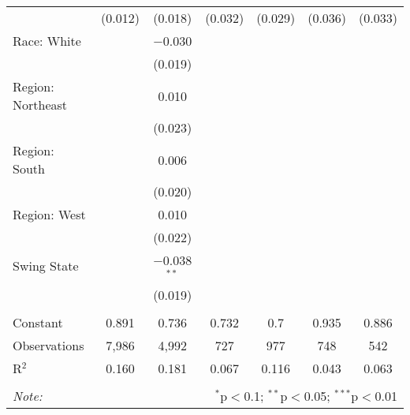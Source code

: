 \begin{tabular}{@{\extracolsep{5pt}}lcccccc}
  & (0.012) & (0.018) & (0.032) & (0.029) & (0.036) & (0.033) \\ 
  Race: White &  & $-$0.030 &  &  &  &  \\ 
  &  & (0.019) &  &  &  &  \\ 
  Region: Northeast &  & 0.010 &  &  &  &  \\ 
  &  & (0.023) &  &  &  &  \\ 
  Region: South &  & 0.006 &  &  &  &  \\ 
  &  & (0.020) &  &  &  &  \\ 
  Region: West &  & 0.010 &  &  &  &  \\ 
  &  & (0.022) &  &  &  &  \\ 
  Swing State &  & $-$0.038$^{**}$ &  &  &  &  \\ 
  &  & (0.019) &  &  &  &  \\ 
 \hline \\[-1.8ex] 
Constant & 0.891 & 0.736 & 0.732 & 0.7 & 0.935 & 0.886 \\ 
Observations & 7,986 & 4,992 & 727 & 977 & 748 & 542 \\ 
R$^{2}$ & 0.160 & 0.181 & 0.067 & 0.116 & 0.043 & 0.063 \\ 
\hline 
\hline \\[-1.8ex] 
\textit{Note:}  & \multicolumn{6}{r}{$^{*}$p$<$0.1; $^{**}$p$<$0.05; $^{***}$p$<$0.01} \\ 
\end{tabular} 